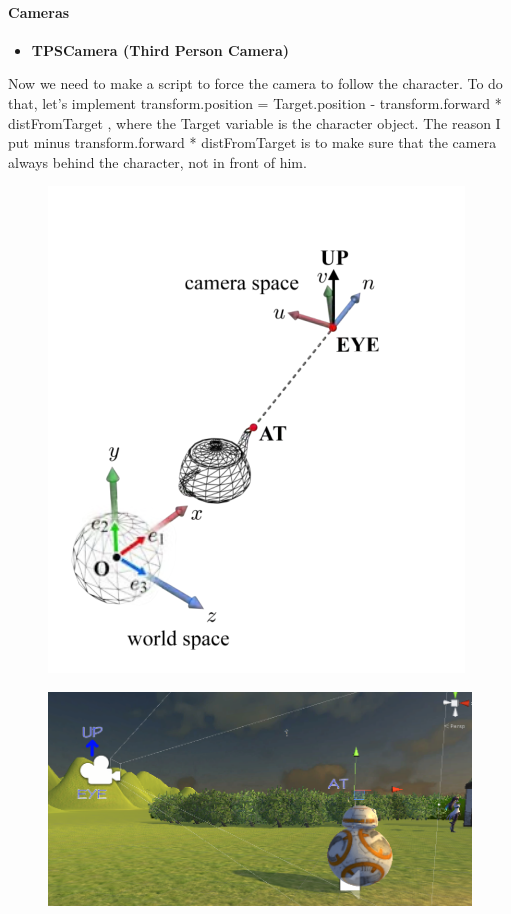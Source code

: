 \documentclass[a4paper, 13pt]{extarticle}
\begin{document}
 	 \paragraph{Cameras}
 	 \begin{itemize}
 	 	\item \bfseries TPSCamera (Third Person Camera) 
 	 \end{itemize}
 	 
 	 Now we need to make a script to force the camera to follow the character. To do that, let's implement transform.position = Target.position - transform.forward * distFromTarget , where the Target variable is the character object. The reason I put minus transform.forward * distFromTarget is to make sure that the camera always behind the character, not in front of him. 
 	 \begin{figure}[h]
 	 	\centering
 	 	\begin{minipage}{.4\textwidth}
 	 		\centering
 	 		\includegraphics[width=0.7\linewidth]{intructions/camera_space.png}
 	 			\centering
 	 		\label{fig:test6}
 	 	\end{minipage}
  		\begin{minipage}{.4\textwidth}
  			\centering
  			\includegraphics[width=1.2\linewidth]{intructions/my_camera_space.png}
  			\label{fig:test7}
  		\end{minipage}
 	 \end{figure}  
\end{document}
